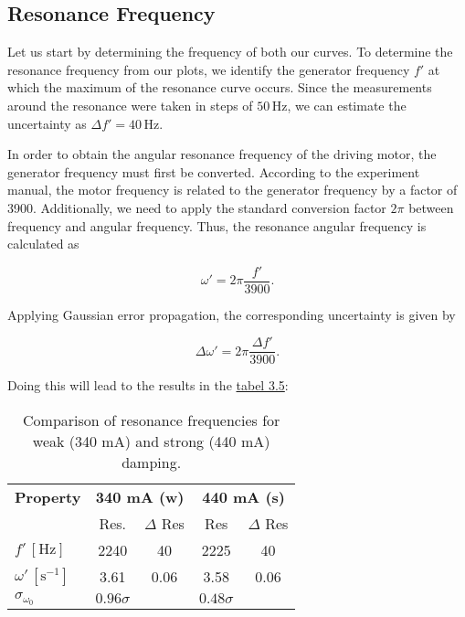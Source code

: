 \subsection*{Resonance Frequency}
Let us start by determining the frequency of both our curves.
To determine the resonance frequency from our plots, we identify the generator frequency $f'$ at which the maximum of the resonance curve occurs. Since the measurements around the resonance were taken in steps of $50\,\text{Hz}$, we can estimate the uncertainty as $\Delta f' = 40\,\text{Hz}$.  

In order to obtain the angular resonance frequency of the driving motor, the generator frequency must first be converted. According to the experiment manual, the motor frequency is related to the generator frequency by a factor of 3900. Additionally, we need to apply the standard conversion factor $2\pi$ between frequency and angular frequency. Thus, the resonance angular frequency is calculated as  

\begin{equation}
    \omega' = 2\pi \frac{f'}{3900}.
\end{equation}

Applying Gaussian error propagation, the corresponding uncertainty is given by  

\begin{equation}
    \Delta \omega' = 2\pi \frac{\Delta f'}{3900}.
\end{equation}

Doing this will lead to the results in the \hyperref[tab:res_frequency]{tabel 3.5}:
\begin{table}[t!]
    \centering
    \begin{tabular}{l | c c | c c}
        \toprule
        \textbf{Property} & \multicolumn{2}{c|}{\textbf{340 mA (w)}} & \multicolumn{2}{c}{\textbf{440 mA (s)}} \\
        & Res. & $\Delta$ Res & Res & $\Delta$ Res \\
        \hline
        $f' \,[\text{Hz}]$ & 2240 & 40 & 2225 & 40 \\
        $\omega' \,[\text{s}^{-1}]$ & 3.61 & 0.06 & 3.58 & 0.06 \\
        \midrule
        $\sigma_{\omega_0}$ & $0.96\sigma$ &  & $0.48\sigma$ &  \\
        \bottomrule
    \end{tabular}
    \caption{Comparison of resonance frequencies for weak (340 mA) and strong (440 mA) damping.}
    \label{tab:res_frequency}
\end{table}

